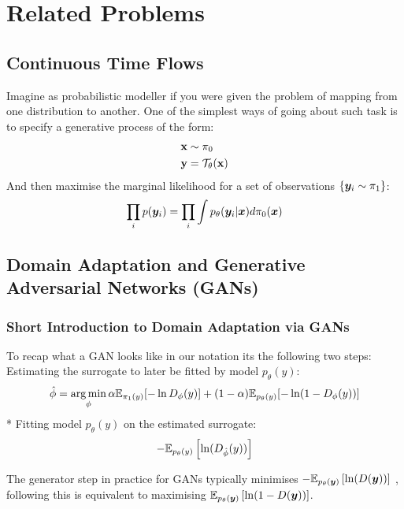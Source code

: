 \documentclass[a4paper,12pt,twoside,openright]{report}
\theoremstyle{definition}
\begin{document}
\chapter{Related Problems}
\section{Continuous Time Flows}

Imagine as probabilistic modeller if you were given the problem of mapping from one distribution to another. One of the simplest ways of going about such task is to specify a generative process of the form:
\begin{align*}
    {\mathbf{x}} &\sim \pi_0 \\
    {\mathbf{y}} &= {\mathcal{T}}_{\theta}({\mathbf{x}})
\end{align*}
And then maximise the marginal likelihood for a set of observations $\{{\bm{y}}_i \sim \pi_1 \}$:
\begin{align*}
    \prod_i p({\bm{y}}_i) = \prod_i \int p_{\theta}({\bm{y}}_i | {\bm{x}}) d\pi_0({\bm{x}})
\end{align*}

\section{Domain Adaptation and Generative Adversarial Networks (GANs)}

\subsection{Short Introduction to Domain Adaptation via GANs}

To recap what a GAN looks like in our notation its the following two steps:
 Estimating the surrogate to later be fitted by model $p_{\theta}(y)$:
 $$ \hat{\phi} = \operatorname*{arg\,min}_{\phi} \alpha \mathbb{E}_{\pi_1(y)}[-\operatorname{ln} D_{\phi}(y)] + (1-\alpha)\mathbb{E}_{p_{\theta}(y)}[-\operatorname{ln} (1-D_{\phi}(y))]$$ 
 * Fitting model $p_{\theta}(y)$ on the estimated surrogate:
 $$ -\mathbb{E}_{p_{\theta}(y)}\left[\operatorname{ln}(D_{\hat{\phi}}(y))\right] $$ 

The generator step in practice for GANs \citep{goodfellow2014generative} typically minimises $-\mathbb{E}_{p_{\theta}({\bm{y}})}\left[\operatorname{ln}(D({\bm{y}}))\right]$  , following \cite{goodfellow2014generative} this is equivalent to maximising  $\mathbb{E}_{p_{\theta}({\bm{y}})}\left[\operatorname{ln}(1-D({\bm{y}}))\right]$.
\end{document}

